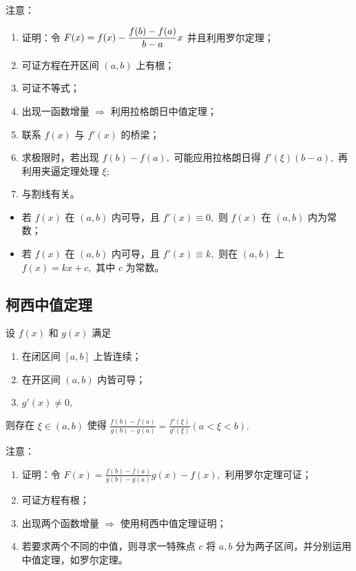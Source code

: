 注意：\begin{enumerate}
    \item 证明：令 $\displaystyle F(x)=f(x)-\frac{f(b)-f(a)}{b-a}x $ 并且利用罗尔定理；
    \item 可证方程在开区间 $ (a,b) $ 上有根；
    \item 可证不等式；
    \item 出现一函数增量 $ \Rightarrow $ 利用拉格朗日中值定理；
    \item 联系 $ f(x) $ 与 $ f'(x) $ 的桥梁；
    \item 求极限时，若出现 $ f(b) - f(a), $ 可能应用拉格朗日得
    $ f'(\xi)(b-a), $ 再利用夹逼定理处理 $ \xi; $ 
    \item 与割线有关。
\end{enumerate}

\begin{Infer}[拉格朗日中值定理推论]

    \begin{itemize}
        \item 若 $ f(x) $ 在 $ (a,b) $ 内可导，且 $ f'(x)\equiv0, $ 则 $ f(x) $ 在 $ (a,b) $ 内为常数；
        \item 若 $ f(x) $ 在 $ (a,b) $ 内可导，且 $ f'(x)\equiv k, $ 则在 $ (a,b) $ 上 $ f(x)=kx+c, $ 
        其中 $ c $ 为常数。
    \end{itemize}
\end{Infer}

\subsection{柯西中值定理}

\begin{Theo}[柯西中值定理]

    设 $ f(x) $ 和 $ g(x) $ 满足
    \begin{enumerate}
        \item 在闭区间 $ [a,b] $ 上皆连续；
        \item 在开区间 $ (a,b) $ 内皆可导；
        \item $ g'(x)\neq 0, $ 
    \end{enumerate}
    则存在 $ \xi\in (a,b) $ 使得 $ \frac{f(b)-f(a)}{g(b)-g(a)}=\frac{f'(\xi)}{g'(\xi)}(a<\xi<b). $ 
\end{Theo}

注意：\begin{enumerate}
    \item 证明：令 $ F(x)=\frac{f(b)-f(a)}{g(b)-g(a)}g(x)-f(x), $ 利用罗尔定理可证；
    \item 可证方程有根；
    \item 出现两个函数增量 $ \Rightarrow $ 使用柯西中值定理证明；
    \item 若要求两个不同的中值，则寻求一特殊点 $ c $ 将 $ a,b $ 分为两子区间，并分别运用中值定理，如罗尔定理。
\end{enumerate}

